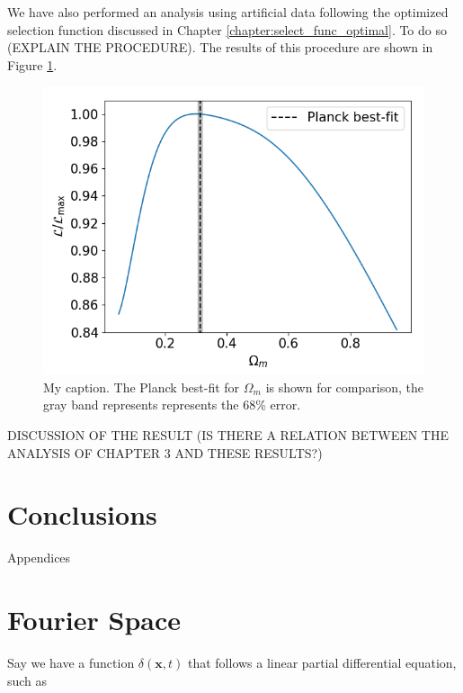 \documentclass[openany,a4paper,12pt,oneside]{book}
\begin{document}
\begin{spacing}{1.5}
We have also performed an analysis using artificial data following the optimized selection function discussed in Chapter \ref{chapter:select_func_optimal}. To do so (EXPLAIN THE PROCEDURE). The results of this procedure are shown in Figure \ref{fig:likelihood_band_optimal}. %

\begin{figure}[!htb]
	\centering
	\includegraphics[width=.7\linewidth]{Imagens/profile_BestBand.png}
	\caption{My caption. The Planck best-fit for $\Omega_m$ is shown for comparison, the gray band represents represents the 68\% error.}
	\label{fig:likelihood_band_optimal}
\end{figure}

DISCUSSION OF THE RESULT (IS THERE A RELATION BETWEEN THE ANALYSIS OF CHAPTER 3 AND THESE RESULTS?)

\chapter{Conclusions}

\appendix

\newpage

\begin{center}
\thispagestyle{empty}
\vspace*{\fill}
\Huge{Appendices}
\vspace*{\fill}
\end{center}

\iffalse %
\chapter{Fourier Space}\label{appendix:FourierSpace}

Say we have a function $\delta(\mathbf{x},t)$ that follows a linear partial differential equation, such as


\end{spacing}
\end{document}
